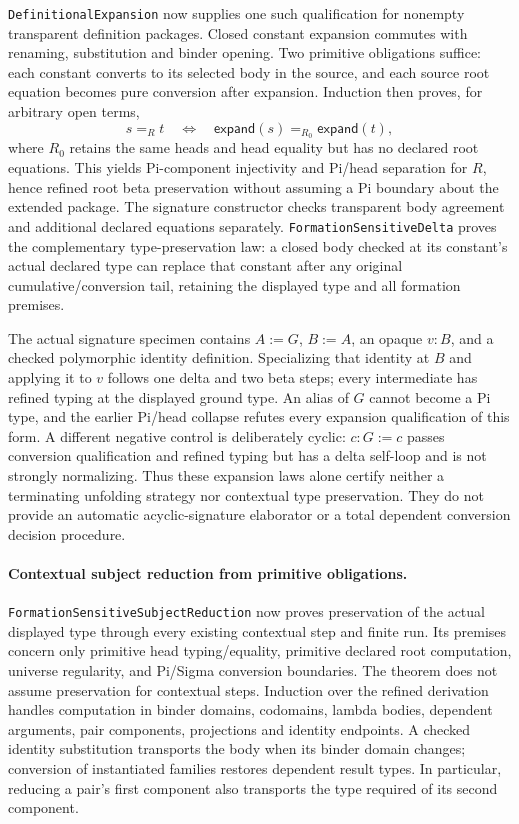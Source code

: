 \documentclass[11pt]{article}
\theoremstyle{definition}
\theoremstyle{remark}
\begin{document}
\nolinkurl{DefinitionalExpansion} now supplies one such qualification for
nonempty transparent definition packages. Closed constant expansion commutes
with renaming, substitution and binder opening. Two primitive obligations
suffice: each constant converts to its selected body in the source, and
each source root equation becomes pure conversion after expansion. Induction
then proves, for arbitrary open terms,
\[
  s =_{R} t \quad\Longleftrightarrow\quad
  \mathsf{expand}(s) =_{R_0} \mathsf{expand}(t),
\]
where $R_0$ retains the same heads and head equality but has no declared root
equations. This yields Pi-component injectivity and Pi/head separation for
$R$, hence refined root beta preservation without assuming a Pi boundary
about the extended package. The signature constructor checks transparent
body agreement and additional declared equations separately.
\nolinkurl{FormationSensitiveDelta} proves the complementary type-preservation
law: a closed body checked at its constant's actual declared type can replace
that constant after any original cumulative/conversion tail, retaining the
displayed type and all formation premises.

The actual signature specimen contains $A:=G$, $B:=A$, an opaque $v:B$,
and a checked polymorphic identity definition. Specializing that identity at
$B$ and applying it to $v$ follows one delta and two beta steps; every
intermediate has refined typing at the displayed ground type. An alias of
$G$ cannot become a Pi type, and the earlier Pi/head collapse refutes every
expansion qualification of this form. A different negative control is
deliberately cyclic: $c:G:=c$ passes conversion qualification and refined
typing but has a delta self-loop and is not strongly normalizing. Thus these
expansion laws alone certify neither a terminating unfolding strategy nor
contextual type preservation. They do not provide an automatic
acyclic-signature elaborator or a total dependent conversion decision procedure.

\paragraph{Contextual subject reduction from primitive obligations.}
\nolinkurl{FormationSensitiveSubjectReduction} now proves preservation of the
actual displayed type through every existing contextual step and finite run.
Its premises concern only primitive head typing/equality, primitive declared
root computation, universe regularity, and Pi/Sigma conversion boundaries.
The theorem does not assume preservation for contextual steps. Induction over
the refined derivation handles computation in binder domains, codomains,
lambda bodies, dependent arguments, pair components, projections and identity
endpoints. A checked identity substitution transports the body when its binder
domain changes; conversion of instantiated families restores dependent result
types. In particular, reducing a pair's first component also transports the
type required of its second component.
\end{document}
